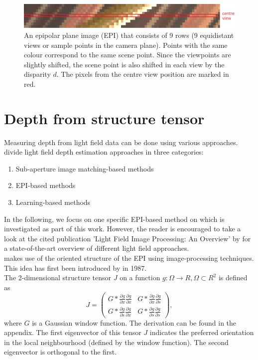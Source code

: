 \documentclass  [
  paper    = a4,
  BCOR     = 10mm,
  twoside,
  fontsize = 12pt,
  fleqn,
  toc      = bibnumbered,
  toc      = listofnumbered,
  numbers  = noendperiod,
  headings = normal,
  listof   = leveldown,
  version  = 3.03
]                                       {scrreprt}
\begin{document}
\begin{figure}[h!]
	\centering
	\includegraphics[width=1\linewidth]{images/simple_epi}
	\caption[Example epipolar plane image]{An epipolar plane image (EPI) that consists of 9 rows (9 equidistant views or sample points in the camera plane). Points with the same colour correspond to the same scene point. Since the viewpoints are slightly shifted, the scene point is also shifted in each view by the disparity $d$. The pixels from the centre view position are marked in red.}
	\label{fig:simpleepi}
\end{figure}


\section{Depth from structure tensor}
Measuring depth from light field data can be done using various approaches.
\cite{wu2017light} divide light field depth estimation approaches in three categories:
\begin{enumerate}
	\item Sub-aperture image matching-based methods
	\item EPI-based methods
	\item Learning-based methods
\end{enumerate}
In the following, we focus on one specific EPI-based method on which is investigated as part of this work. However, the reader is encouraged to take a look at the cited publication 'Light Field Image Processing: An Overview' by \cite{wu2017light} for a state-of-the-art overview of different light field approaches.\\
\cite{wanner2014orientation} makes use of the oriented structure of the EPI using image-processing techniques. This idea has first been introduced by \cite{bigun1987optimal} in 1987.\\

The 2-dimensional structure tensor $J$  on a function $g:\Omega \rightarrow \!R, \Omega \subset \!R^2 $ is defined as
\begin{equation}\label{eq:structuretensor}
J =\left(
\begin{matrix}
G*\frac{\partial g}{\partial x}\frac{\partial g}{\partial x} & G*\frac{\partial g}{\partial x}\frac{\partial g}{\partial s} \\
G*\frac{\partial g}{\partial s}\frac{\partial g}{\partial x} & G*\frac{\partial g}{\partial s}\frac{\partial g}{\partial s} 
\end{matrix}\right),
\end{equation}
 where $G$ is a Gaussian window function. The derivation can be found in the appendix.
 The first eigenvector of this tensor $J$ indicates the preferred orientation in the local neighbourhood (defined by the window function). The second eigenvector is orthogonal to the first. 
 
\end{document}
